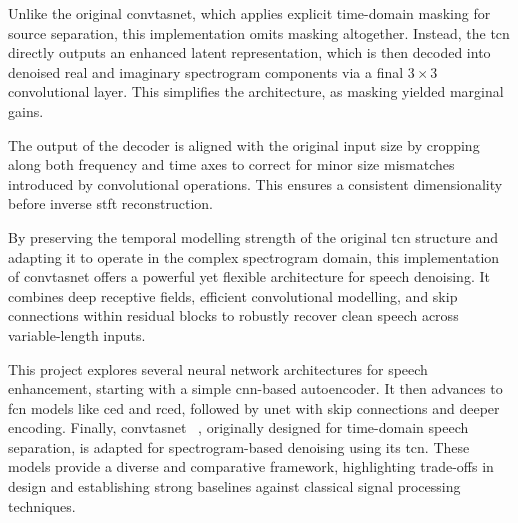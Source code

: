 Unlike the original \gls{convtasnet}, which applies explicit time-domain masking for source separation, this implementation omits masking altogether. Instead, the \gls{tcn} directly outputs an enhanced latent representation, which is then decoded into denoised real and imaginary spectrogram components via a final \(3 \times 3\) convolutional layer. This simplifies the architecture, as masking yielded marginal gains.

The output of the decoder is aligned with the original input size by cropping along both frequency and time axes to correct for minor size mismatches introduced by convolutional operations. This ensures a consistent dimensionality before inverse \gls{stft} reconstruction.

By preserving the temporal modelling strength of the original \gls{tcn} structure and adapting it to operate in the complex spectrogram domain, this implementation of \gls{convtasnet} offers a powerful yet flexible architecture for speech denoising. It combines deep receptive fields, efficient convolutional modelling, and skip connections within residual blocks to robustly recover clean speech across variable-length inputs.

\vspace{2em}

This project explores several neural network architectures for speech enhancement, starting with a simple \gls{cnn}-based autoencoder. It then advances to \gls{fcn} models like \gls{ced} and \gls{rced}\~\cite{park2017acoustic}, followed by \gls{unet} with skip connections and deeper encoding. Finally, \gls{convtasnet} ~\cite{luo2019conv}, originally designed for time-domain speech separation, is adapted for spectrogram-based denoising using its \gls{tcn}. These models provide a diverse and comparative framework, highlighting trade-offs in design and establishing strong baselines against classical signal processing techniques.

